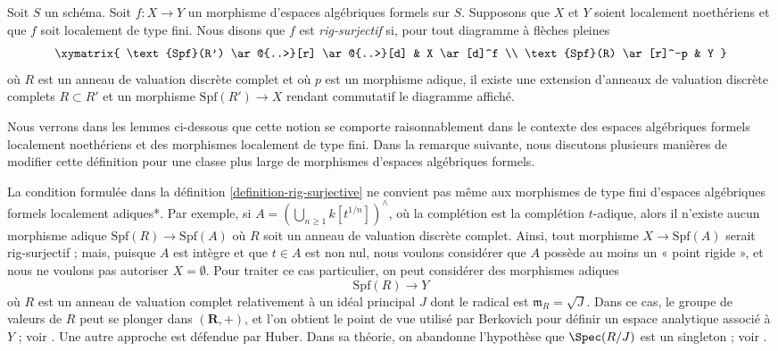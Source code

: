 \begin{definition}
\label{definition-rig-surjective}
Soit $S$ un schéma. Soit $f : X \to Y$ un morphisme d'espaces
algébriques formels sur $S$. Supposons que $X$ et $Y$ soient localement
noethériens et que $f$ soit localement de type fini. Nous disons que
$f$ est {\it rig-surjectif} si, pour tout diagramme à flèches pleines
$$
\xymatrix{
\text{Spf}(R') \ar@{..>}[r] \ar@{..>}[d] & X \ar[d]^f \\
\text{Spf}(R) \ar[r]^-p & Y
}
$$
où $R$ est un anneau de valuation discrète complet et où
$p$ est un morphisme adique, il existe une
extension d'anneaux de valuation discrète complets $R \subset R'$
et un morphisme $\text{Spf}(R') \to X$ rendant commutatif le diagramme affiché.
\end{definition}

\noindent
Nous verrons dans les lemmes ci-dessous que cette notion se comporte raisonnablement
dans le contexte des espaces algébriques formels localement noethériens et des morphismes
localement de type fini.
Dans la remarque suivante, nous discutons plusieurs manières de modifier cette définition
pour une classe plus large de morphismes d'espaces algébriques formels.

\begin{remark}
\label{remark-rig-surjective-more-general}
La condition formulée dans la définition \ref{definition-rig-surjective}
ne convient pas même aux morphismes de type fini
d'espaces algébriques formels localement adiques*.
Par exemple, si $A = (\bigcup_{n \geq 1} k[t^{1/n}])^\wedge$,
où la complétion est la complétion $t$-adique, alors
il n'existe aucun morphisme adique $\text{Spf}(R) \to \text{Spf}(A)$
où $R$ soit un anneau de valuation discrète complet.
Ainsi, tout morphisme $X \to \text{Spf}(A)$ serait rig-surjectif ;
mais, puisque $A$ est intègre et que $t \in A$ est non nul, nous voulons
considérer que $A$ possède au moins un « point rigide », et nous ne voulons
pas autoriser $X = \emptyset$. Pour traiter ce
cas particulier, on peut considérer des morphismes adiques
$$
\text{Spf}(R) \longrightarrow Y
$$
où $R$ est un anneau de valuation complet relativement à un idéal
principal $J$ dont le radical est $\mathfrak m_R = \sqrt{J}$.
Dans ce cas, le groupe de valeurs de $R$ peut se plonger dans
$(\mathbf{R}, +)$, et l'on obtient le point de vue utilisé par
Berkovich pour définir un espace analytique associé à $Y$ ; voir
\cite{Berkovich}. Une autre approche est défendue par Huber. Dans sa théorie,
on abandonne l'hypothèse que $\Spec(R/J)$ est un singleton ; voir
\cite{Huber-continuous-valuations}.
\end{remark}

